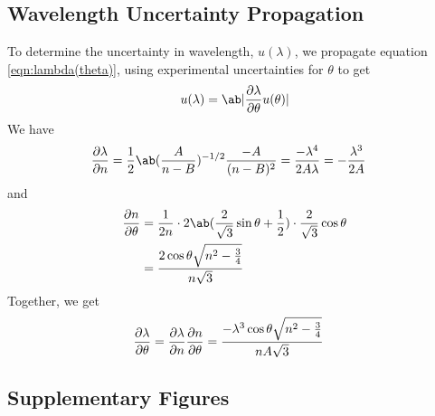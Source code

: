 \documentclass[
	a4paper, %
	10pt, %
	twoside, %
]{journal}
\begin{document}
\subsection{Wavelength Uncertainty Propagation}
\label{appendix:wavelength-uncertainty-prop}
To determine the uncertainty in wavelength, $u(\lambda)$, we propagate equation \ref{eqn:lambda(theta)}, using experimental uncertainties for $\theta$ to get 
\begin{equation}
    u(\lambda) = \ab|\diffp{\lambda}{\theta} u(\theta)|
\end{equation}
We have 
\begin{align*}
    \diffp{\lambda}{n}
    &= \frac12\ab(\frac{A}{n - B})^{-1/2} \frac{-A}{(n - B)^2} = \frac{-\lambda^4}{2A\lambda} = -\frac{\lambda^3}{2A}
\end{align*}
and 
\begin{align*}
    \diffp{n}{\theta}
    &= \frac1{2n}\cdot 2\ab(\frac2{\sqrt3}\sin\theta + \frac12)\cdot \frac2{\sqrt3}\cos\theta \\ 
    &= \frac{2\cos\theta\sqrt{n^2 - \frac34}}{n\sqrt 3}
\end{align*}
Together, we get 
\begin{align}
\label{eqn:dlambda_dtheta}
    \diffp{\lambda}{\theta} &= \diffp{\lambda}{n} \diffp{n}{\theta} = \frac{-\lambda^3\cos\theta\sqrt{n^2 - \frac34}}{nA\sqrt 3}
\end{align}



\subsection{Supplementary Figures}
\label{appendix:supp-figs}
\end{document}
